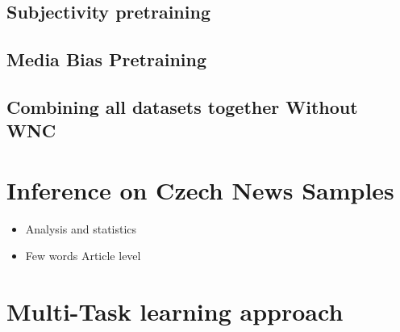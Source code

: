  \subsection{Subjectivity pretraining}
 \subsection{Media Bias Pretraining}
 \subsection{Combining all datasets together Without WNC}

 
 
 
 
\section{Inference on Czech News Samples}
\begin{itemize}
    \item Analysis and statistics
    \item Few words Article level
\end{itemize}


\section{Multi-Task learning approach}\label{mtl}